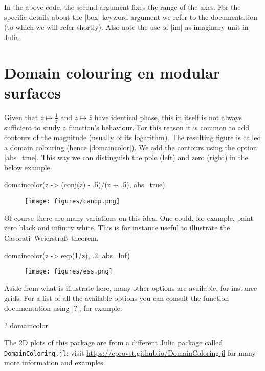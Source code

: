 \documentclass[a4paper]{article}
\begin{document}
In the above code, the second argument fixes the range of the axes. For the
specific details about the \jlv|box| keyword argument we refer to the
documentation (to which we will refer shortly). Also note the use of \jlv|im| as
imaginary unit in Julia.

\section{Domain colouring en modular surfaces}

Given that $z \mapsto \frac{1}{z}$ and $z \mapsto \bar{z}$ have identical phase,
this in itself is not always sufficient to study a function's behaviour.  For
this reason it is common to add contours of the magnitude (usually of its
logarithm). The resulting figure is called a domain colouring (hence
\jlv|domaincolor|). We add the contours using the option \jlv|abs=true|. This
way we can distinguish the pole (left) and zero (right) in the below example.

\begin{juliaverbatim}
	domaincolor(z -> (conj(z) - .5)/(z + .5), abs=true)
\end{juliaverbatim}
\begin{figure}[H]
	\centering
	\texttt{[image: figures/candp.png]}
\end{figure}

Of course there are many variations on this idea. One could, for example, paint
zero black and infinity white. This is for instance useful to illustrate the
Casorati--Weierstra\ss\ theorem.

\begin{juliaverbatim}
	domaincolor(z -> exp(1/z), .2, abs=Inf)
\end{juliaverbatim}
\begin{figure}[H]
	\centering
	\texttt{[image: figures/ess.png]}
\end{figure}

Aside from what is illustrate here, many other options are available, for
instance grids. For a list of all the available options you can consult the
function documentation using \jlv|?|, for example:

\begin{juliaverbatim}
	? domaincolor
\end{juliaverbatim}

The 2D plots of this package are from a different Julia package called
\texttt{DomainColoring.jl}; visit
\url{https://eprovst.github.io/DomainColoring.jl} for many more information and
examples.
\end{document}
